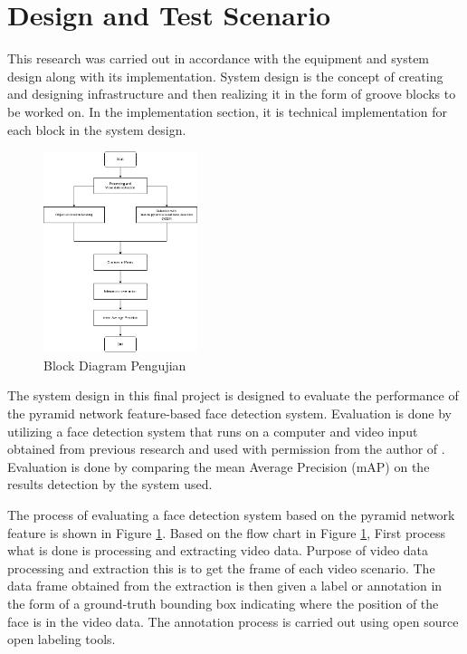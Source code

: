 \section{Design and Test Scenario}
\label{sec:arsitektur}


This research was carried out in accordance with the equipment and system design along with its implementation.
System design is the concept of creating and designing infrastructure and then realizing it
in the form of groove blocks to be worked on. In the implementation section, it is
technical implementation for each block in the system design.

\begin{figure} [ht]
  \centering
  \includegraphics[width=0.4\textwidth]{gambar/blockdiagram.png}

  \caption{Block Diagram Pengujian}
  \label{fig:blockdiagram}
\end{figure}

The system design in this final project is designed to evaluate the performance of the pyramid network feature-based face detection system. Evaluation is done by
utilizing a face detection system that runs on a computer 
and video input obtained from previous research and used with permission from the author of \citep{nugrohoevalution2016}. 
Evaluation is done by comparing the mean Average Precision (mAP) on the results detection by the system used.

The process of evaluating a face detection system based on the pyramid network feature is shown in Figure \ref{fig:blockdiagram}.
Based on the flow chart in Figure \ref{fig:blockdiagram},
First process
what is done is processing and extracting video data. Purpose of video data processing and extraction
this is to get the frame of each video scenario.
The data frame obtained from the extraction is then given a label or annotation in the form of a ground-truth bounding box indicating where
the position of the face is in the video data.
The annotation process is carried out using open source open labeling tools.

